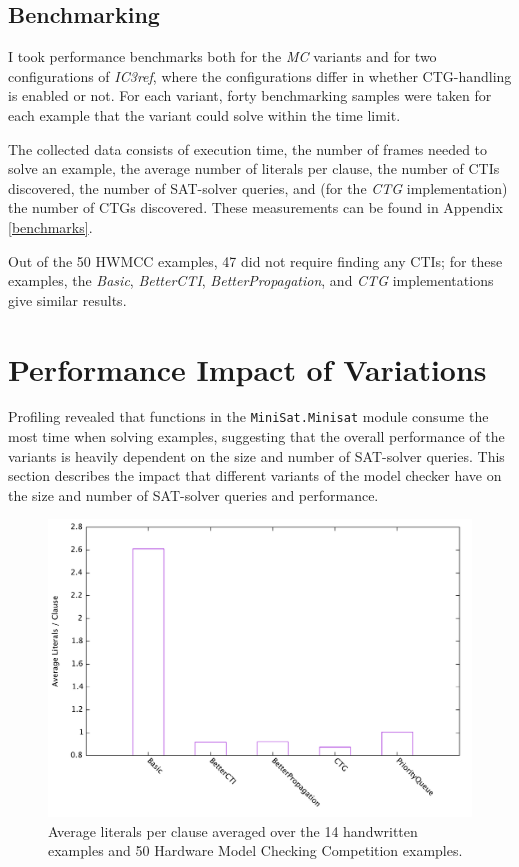 \documentclass[12pt,a4paper,twoside,openright]{report}
\begin{document}
{{\subsection{Benchmarking}
\label{eval:benchmarking}
I took performance benchmarks both for the \emph{MC} variants and for two configurations
of \emph{IC3ref}, where the configurations differ in whether CTG-handling is enabled
or not. For each variant, forty benchmarking samples were taken for each example that
the variant could solve within the time limit.

The collected data consists of execution time,
the number of frames needed to solve an example,
the average number of literals per clause, the number of CTIs discovered, the number of SAT-solver queries,
and (for the \emph{CTG} implementation) the number of CTGs discovered. These measurements can be found in
Appendix \ref{benchmarks}.

Out of the 50 HWMCC examples, 47 did not require finding any
CTIs; for these examples, the \emph{Basic}, \emph{BetterCTI}, \emph{BetterPropagation},
and \emph{CTG} implementations give similar results. 

\section{Performance Impact of Variations}
\label{eval:variants}

Profiling revealed that functions in the \verb,MiniSat.Minisat, module consume the most time
when solving examples, suggesting that the overall performance of the variants is heavily dependent on
the size and number of SAT-solver queries.
This section describes the impact that different
variants of the model checker have on the size and number of SAT-solver queries and performance.

\begin{figure}[t]
\includegraphics[width=16cm]{litspercls.pdf}
\caption{Average literals per clause averaged over the 14 handwritten examples and 50
 Hardware
Model Checking Competition examples.}
\label{eval:lits}
\end{figure}

}}
\end{document}
